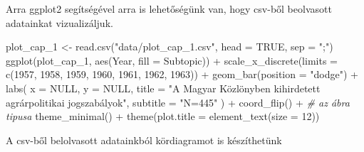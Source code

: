 \documentclass[
]{book}
\newenvironment{Shaded}{\begin{snugshade}}{\end{snugshade}}
\newcommand{\AttributeTok}[1]{\textcolor[rgb]{0.77,0.63,0.00}{#1}}
\newcommand{\CommentTok}[1]{\textcolor[rgb]{0.56,0.35,0.01}{\textit{#1}}}
\newcommand{\ConstantTok}[1]{\textcolor[rgb]{0.00,0.00,0.00}{#1}}
\newcommand{\DecValTok}[1]{\textcolor[rgb]{0.00,0.00,0.81}{#1}}
\newcommand{\FunctionTok}[1]{\textcolor[rgb]{0.00,0.00,0.00}{#1}}
\newcommand{\NormalTok}[1]{#1}
\newcommand{\OtherTok}[1]{\textcolor[rgb]{0.56,0.35,0.01}{#1}}
\newcommand{\SpecialCharTok}[1]{\textcolor[rgb]{0.00,0.00,0.00}{#1}}
\newcommand{\StringTok}[1]{\textcolor[rgb]{0.31,0.60,0.02}{#1}}
\begin{document}
Arra ggplot2 segítségével arra is lehetőségünk van, hogy csv-ből
beolvasott adatainkat vizualizáljuk.

\begin{Shaded}
\begin{Highlighting}[]
\NormalTok{plot\_cap\_1 }\OtherTok{\textless{}{-}} \FunctionTok{read.csv}\NormalTok{(}\StringTok{"data/plot\_cap\_1.csv"}\NormalTok{, }\AttributeTok{head =} \ConstantTok{TRUE}\NormalTok{, }\AttributeTok{sep =} \StringTok{";"}\NormalTok{) }
\FunctionTok{ggplot}\NormalTok{(plot\_cap\_1, }\FunctionTok{aes}\NormalTok{(Year, }\AttributeTok{fill =}\NormalTok{ Subtopic)) }\SpecialCharTok{+} 
  \FunctionTok{scale\_x\_discrete}\NormalTok{(}\AttributeTok{limits =} \FunctionTok{c}\NormalTok{(}\DecValTok{1957}\NormalTok{, }\DecValTok{1958}\NormalTok{, }\DecValTok{1959}\NormalTok{, }\DecValTok{1960}\NormalTok{, }\DecValTok{1961}\NormalTok{, }\DecValTok{1962}\NormalTok{, }\DecValTok{1963}\NormalTok{)) }\SpecialCharTok{+}
  \FunctionTok{geom\_bar}\NormalTok{(}\AttributeTok{position =} \StringTok{"dodge"}\NormalTok{) }\SpecialCharTok{+} 
  \FunctionTok{labs}\NormalTok{(}
    \AttributeTok{x =} \ConstantTok{NULL}\NormalTok{, }\AttributeTok{y =} \ConstantTok{NULL}\NormalTok{, }
    \AttributeTok{title =} \StringTok{"A Magyar Közlönyben kihirdetett agrárpolitikai jogszabályok"}\NormalTok{, }
    \AttributeTok{subtitle =} \StringTok{"N=445"}
\NormalTok{  ) }\SpecialCharTok{+} 
  \FunctionTok{coord\_flip}\NormalTok{() }\SpecialCharTok{+} \CommentTok{\# az ábra tipusa}
  \FunctionTok{theme\_minimal}\NormalTok{() }\SpecialCharTok{+}
  \FunctionTok{theme}\NormalTok{(}\AttributeTok{plot.title =} \FunctionTok{element\_text}\NormalTok{(}\AttributeTok{size =} \DecValTok{12}\NormalTok{)) }
\end{Highlighting}
\end{Shaded}

A csv-ből belolvasott adatainkból kördiagramot is készíthetünk
\end{document}
